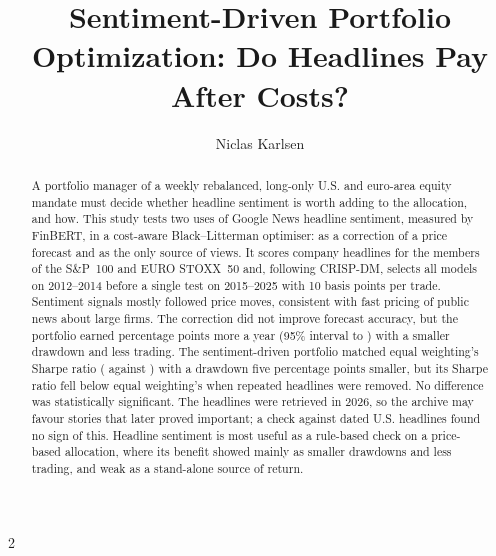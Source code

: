 \documentclass{elsword}
\title{Sentiment-Driven Portfolio Optimization: Do Headlines Pay After Costs?}
\author{Niclas Karlsen}
\affiliation{Norwegian University of Life Sciences, REALTEK, Industrial Economics (IND\O K)}
\begin{document}
\begin{abstract}
A portfolio manager of a weekly rebalanced, long-only U.S. and euro-area equity mandate must decide whether headline sentiment is worth adding to the allocation, and how. This study tests two uses of Google News headline sentiment, measured by FinBERT, in a cost-aware Black--Litterman optimiser: as a correction of a price forecast and as the only source of views. It scores \Headlines{} company headlines for the members of the S\&P~100 and EURO STOXX~50 and, following CRISP-DM, selects all models on 2012--2014 before a single test on 2015--2025 with 10 basis points per trade. Sentiment signals mostly followed price moves, consistent with fast pricing of public news about large firms. The correction did not improve forecast accuracy, but the portfolio earned \BootCombinedPriceCAGR{} percentage points more a year (95\% interval \BootCombinedPriceCAGRLow{} to \BootCombinedPriceCAGRHigh) with a smaller drawdown and less trading. The sentiment-driven portfolio matched equal weighting's Sharpe ratio (\SentimentSharpe{} against \EWSharpe) with a drawdown five percentage points smaller, but its Sharpe ratio fell below equal weighting's when repeated headlines were removed. No difference was statistically significant. The headlines were retrieved in 2026, so the archive may favour stories that later proved important; a check against dated U.S. headlines found no sign of this. Headline sentiment is most useful as a rule-based check on a price-based allocation, where its benefit showed mainly as smaller drawdowns and less trading, and weak as a stand-alone source of return.
\end{abstract}
\maketitle
\begin{multicols}{2}












\end{multicols}

\clearpage
\appendix

\end{document}
